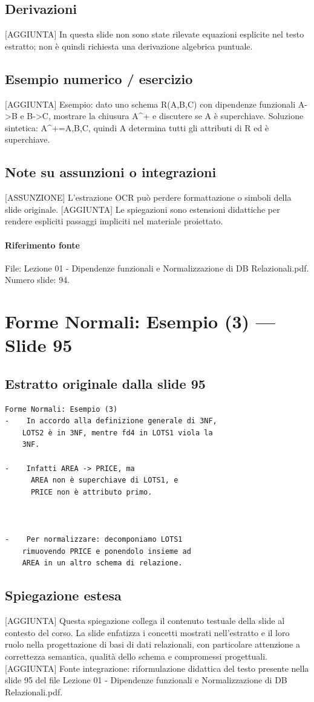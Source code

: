 \documentclass[11pt]{article}
\begin{document}
\subsection*{Derivazioni}
[AGGIUNTA] In questa slide non sono state rilevate equazioni esplicite nel testo estratto; non è quindi richiesta una derivazione algebrica puntuale.
\subsection*{Esempio numerico / esercizio}
[AGGIUNTA] Esempio: dato uno schema R(A,B,C) con dipendenze funzionali A->B e B->C, mostrare la chiusura A^+ e discutere se A è superchiave. Soluzione sintetica: A^+={A,B,C}, quindi A determina tutti gli attributi di R ed è superchiave.
\subsection*{Note su assunzioni o integrazioni}
[ASSUNZIONE] L'estrazione OCR può perdere formattazione o simboli della slide originale.
[AGGIUNTA] Le spiegazioni sono estensioni didattiche per rendere espliciti passaggi impliciti nel materiale proiettato.
\paragraph{Riferimento fonte} File: Lezione 01 - Dipendenze funzionali e Normalizzazione di DB Relazionali.pdf. Numero slide: 94.
\section{Forme Normali: Esempio (3) --- Slide 95}
\subsection*{Estratto originale dalla slide 95}
\begin{lstlisting}
Forme Normali: Esempio (3)
-    In accordo alla definizione generale di 3NF,
    LOTS2 è in 3NF, mentre fd4 in LOTS1 viola la
    3NF.

-    Infatti AREA -> PRICE, ma
      AREA non è superchiave di LOTS1, e
      PRICE non è attributo primo.



-    Per normalizzare: decomponiamo LOTS1
    rimuovendo PRICE e ponendolo insieme ad
    AREA in un altro schema di relazione.
\end{lstlisting}
\subsection*{Spiegazione estesa}
[AGGIUNTA] Questa spiegazione collega il contenuto testuale della slide al contesto del corso. La slide enfatizza i concetti mostrati nell'estratto e il loro ruolo nella progettazione di basi di dati relazionali, con particolare attenzione a correttezza semantica, qualità dello schema e compromessi progettuali.
[AGGIUNTA] Fonte integrazione: riformulazione didattica del testo presente nella slide 95 del file Lezione 01 - Dipendenze funzionali e Normalizzazione di DB Relazionali.pdf.
\end{document}
